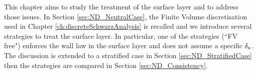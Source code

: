 This chapter aims to study the treatment of
the surface layer and to address those issues.
In Section \ref{sec:ND_NeutralCase}, the Finite Volume
discretisation used in Chapter \ref{ch:discreteSchwarzAnalysis}
is recalled and we introduce several strategies to treat
the surface layer.
In particular, one of the strategies (``FV free") enforces
the wall law in the surface layer and does not
assume a specific $\delta_{\rm a}$.
The discussion is extended to a stratified case
in Section \ref{sec:ND_StratifiedCase} then
the strategies are compared in Section \ref{sec:ND_Consistency}.
